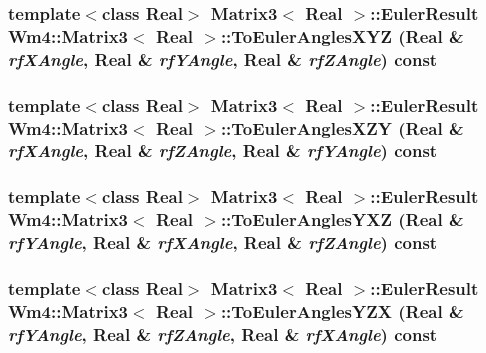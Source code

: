 \subsubsection{\setlength{\rightskip}{0pt plus 5cm}template$<$class Real$>$ {\bf Matrix3}$<$ Real $>$::{\bf Euler\-Result} {\bf Wm4::Matrix3}$<$ Real $>$::To\-Euler\-Angles\-XYZ (Real \& {\em rf\-XAngle}, Real \& {\em rf\-YAngle}, Real \& {\em rf\-ZAngle}) const}\label{classWm4_1_1Matrix3_91326e97bc6021fae486c9d39fae10f7}


\subsubsection{\setlength{\rightskip}{0pt plus 5cm}template$<$class Real$>$ {\bf Matrix3}$<$ Real $>$::{\bf Euler\-Result} {\bf Wm4::Matrix3}$<$ Real $>$::To\-Euler\-Angles\-XZY (Real \& {\em rf\-XAngle}, Real \& {\em rf\-ZAngle}, Real \& {\em rf\-YAngle}) const}\label{classWm4_1_1Matrix3_aa5c0100bb6999c0c9cc1719b4ec9c47}


\subsubsection{\setlength{\rightskip}{0pt plus 5cm}template$<$class Real$>$ {\bf Matrix3}$<$ Real $>$::{\bf Euler\-Result} {\bf Wm4::Matrix3}$<$ Real $>$::To\-Euler\-Angles\-YXZ (Real \& {\em rf\-YAngle}, Real \& {\em rf\-XAngle}, Real \& {\em rf\-ZAngle}) const}\label{classWm4_1_1Matrix3_f59e6ebecc9556206fb5ee132b9991f1}


\subsubsection{\setlength{\rightskip}{0pt plus 5cm}template$<$class Real$>$ {\bf Matrix3}$<$ Real $>$::{\bf Euler\-Result} {\bf Wm4::Matrix3}$<$ Real $>$::To\-Euler\-Angles\-YZX (Real \& {\em rf\-YAngle}, Real \& {\em rf\-ZAngle}, Real \& {\em rf\-XAngle}) const}\label{classWm4_1_1Matrix3_63322aac22f1c3d49d3b2b802774071f}


